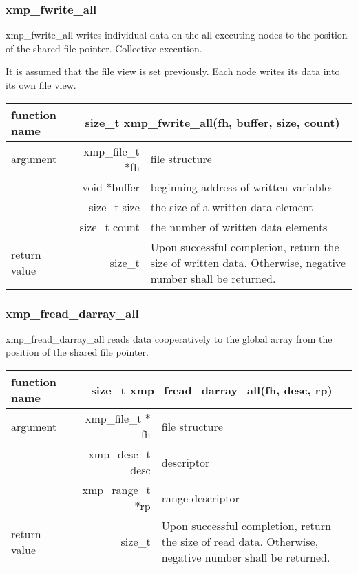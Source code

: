    \subsubsection{xmp\_fwrite\_all}
   xmp\_fwrite\_all writes individual data on the all executing nodes to the position of the shared file
   pointer. Collective execution.

   It is assumed that the file view is set previously. Each node writes its data into its own file view.

   \begin{table}[h]
    \begin{center}
     \begin{tabular}{|l|r|p{80mm}|}
      \hline
      {\bf function name}  & \multicolumn{2}{c|}{\bf size\_t
      xmp\_fwrite\_all(fh, buffer, size, count)}  \\ \hline \hline
      argument & xmp\_file\_t $*$fh & file structure \\ \cline{2-3}
      & void $*$buffer & beginning address of written variables \\ \cline{2-3}
      & size\_t size & the size of a written data element \\ \cline{2-3}
      & size\_t count & the number of written data elements \\ \hline
      return value & size\_t & Upon successful completion, return the size
      of written data. Otherwise, negative number shall be
      returned. \\ \hline
      \end{tabular}
     \end{center}
    \label{tb:aaa}
   \end{table}

   \subsubsection{xmp\_fread\_darray\_all}
   xmp\_fread\_darray\_all reads data cooperatively to the global array from the position of the shared file pointer.

   \begin{table}[h]
    \begin{center}
     \begin{tabular}{|l|r|p{80mm}|}
      \hline
      {\bf function name}  & \multicolumn{2}{c|}{\bf size\_t
      xmp\_fread\_darray\_all(fh, desc, rp)} \\ \hline \hline
      argument & xmp\_file\_t $*$fh & file structure \\ \cline{2-3}
      & xmp\_desc\_t desc & descriptor \\ \cline{2-3}
      & xmp\_range\_t $*$rp & range descriptor \\ \hline
      return value & size\_t & Upon successful completion, return the size
	      of read data. Otherwise, negative number shall be
	      returned. \\ \hline
      \end{tabular}
     \end{center}
    \label{tb:aaa}
   \end{table}

